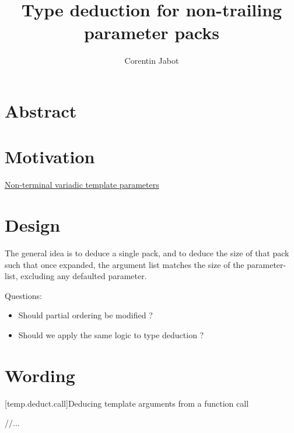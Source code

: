 \documentclass{wg21}
\title{Type deduction for non-trailing parameter packs}
\author{Corentin Jabot}{corentin.jabot@gmail.com}
\begin{document}
\maketitle

\section{Abstract}

\section{Motivation}


\href{https://cor3ntin.github.io/posts/variadic/}{Non-terminal variadic template parameters}

\section{Design}

The general idea is to deduce a single pack, and to deduce the size of that pack such that once expanded,
the argument list matches the size of the parameter-list, excluding any defaulted parameter.

Questions:
\begin{itemize}
    \item Should partial ordering be modified ?
    \item Should we apply the same logic to type deduction ?
\end{itemize}

\section{Wording}

[temp.deduct.call]{Deducing template arguments from a function call}

//...

\end{document}
